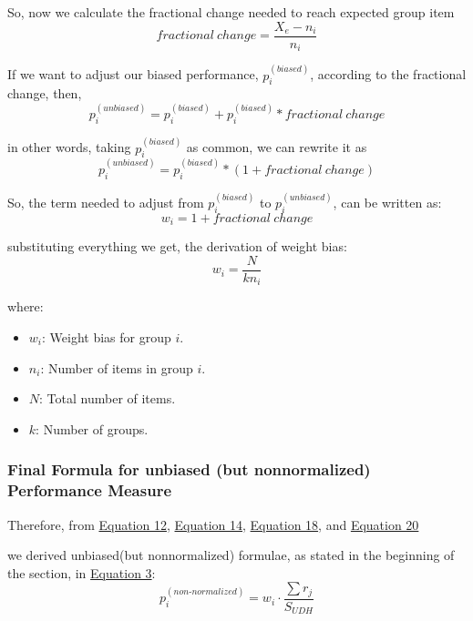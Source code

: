 \documentclass[man,floatsintext]{apa7}
\begin{document}
So, now we calculate the fractional change needed to reach expected group item
\begin{equation}
 fractional \ change = \frac{X_e - n_i}{n_i}
\end{equation}

If we want to adjust our biased performance, $p_i^{(biased)}$, according to the fractional change, 
then,
\begin{equation}
    p_i^{(unbiased)} = p_i^{(biased)} +  p_i^{(biased)} *  fractional \ change
\end{equation}

in other words, taking $p_i^{(biased)}$ as common, we can rewrite it as
\begin{equation}
\label{eq:p-unbiased}
    p_i^{(unbiased)} = p_i^{(biased)} * (1 +  fractional \ change)
\end{equation}

So, the term needed to adjust from $p_i^{(biased)}$ to $p_i^{(unbiased)}$, can be written as:
\begin{equation}
    w_i = 1 + fractional \ change
\end{equation}

substituting everything we get, the derivation of weight bias:
\begin{equation}\label{eq:weight-bias}
    w_i = \frac{N}{kn_i}
\end{equation}

where:
\begin{itemize}
    \item $w_i$: Weight bias for group $i$.
    \item $n_i$: Number of items in group $i$.
    \item $N$: Total number of items.
    \item $k$: Number of groups.
\end{itemize}

\subsubsection{Final Formula for unbiased (but non\text{-}normalized) Performance Measure}
Therefore, from \hyperref[eq:SUDH]{Equation 12}, \hyperref[eq:p-biased]{Equation 14},  \hyperref[eq:p-unbiased]{Equation 18}, and \hyperref[eq:weight-bias]{Equation 20}

we derived unbiased(but non\text{-}normalized) formulae, as stated in the beginning of the section, in \hyperref[eq:non-normalized]{Equation 3}:
\begin{equation}
	\label{p-non-normalized}
    p_i^{(non\text{-}normalized)} = w_i \cdot \frac{\sum r_j}{ S_{UDH} }
\end{equation}
\end{document}
